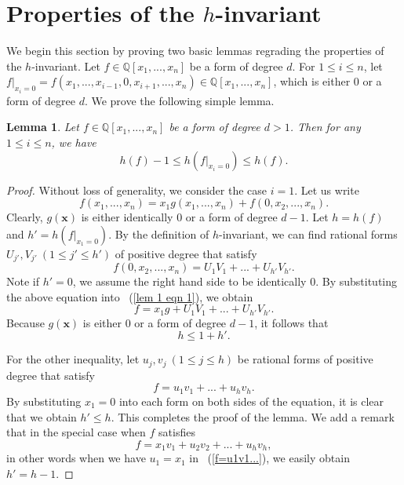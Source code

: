 \documentclass[12pt]{amsart}
\newtheorem{lem}[thm]{Lemma}
\theoremstyle{definition}
\theoremstyle{remark}
\numberwithin{equation}{section}
\begin{document}
\section{Properties of the $h$-invariant}
\label{section h-inv}
We begin this section by proving two basic lemmas regrading the properties of the $h$-invariant.
Let $f \in \mathbb{Q}[x_1, ..., x_n]$ be a form of degree $d$. For $1 \leq i \leq n$, let $f |_{x_i=0} = f(x_1, ..., x_{i-1}, 0, x_{i+1},..., x_n ) \in \mathbb{Q}[x_1, ..., x_n]$, which is either $0$ or a form of degree $d$.
We prove the following simple lemma.
\begin{lem}
\label{h ineq 1}
Let ${f} \in \mathbb{Q}[x_1, ..., x_n]$ be a form of degree $d>1$.
Then for any  $1 \leq i \leq n$, we have
$$
h( {f} ) -1   \leq h( {f} |_{x_i=0} ) \leq h( {f} ).
$$
\end{lem}

\begin{proof}
Without loss of generality, we consider the case $i=1$. Let us write
\begin{equation}
\label{lem 1 eqn 1}
f(x_1, ..., x_n) = x_1 g(x_1, ..., x_n) + f(0, x_2, ..., x_n).
\end{equation}
Clearly, $g(\mathbf{x})$ is either identically $0$ or a form of degree $d-1$.
Let $h = h( {f} )$ and $h' = h( {f} |_{x_1=0} )$.
By the definition of $h$-invariant, we can find rational forms $U_{j'}, V_{j'} \ (1 \leq j' \leq h')$ of positive degree
that satisfy
$$
f(0, x_2, ..., x_n)= U_1 V_1 + ... + U_{h'} V_{h'}.
$$
Note if $h'=0$, we assume the right hand side to be identically $0$.
By substituting the above equation into ~(\ref{lem 1 eqn 1}), we obtain
$$
f  = x_1 g+ U_1 V_1 + ... + U_{h'} V_{h'}.
$$
Because $g(\mathbf{x})$ is either $0$ or a form of degree $d-1$, it follows that
$$
h \leq 1 + h'.
$$

For the other inequality, let $u_{j}, v_{j} \ (1 \leq j \leq h)$ be rational forms of positive degree that
satisfy
\begin{equation}
\label{f=u1v1...}
f  = u_1 v_1 + ... + u_{h} v_{h}.
\end{equation}
By substituting $x_1 = 0$ into each form on both sides of the equation, it is clear that
we obtain $h' \leq h$. This completes the proof of the lemma.
We add a remark that in the special case when $f$ satisfies
$$
f  = x_1 v_1 + u_2 v_2 + ... + u_{h} v_{h},
$$
in other words when we have $u_1 = x_1$ in ~(\ref{f=u1v1...}),
we easily obtain $h' = h-1$.
\end{proof}
\end{document}
